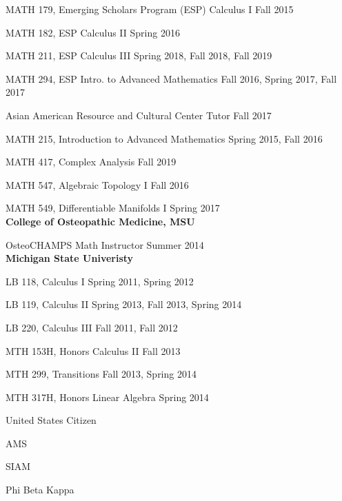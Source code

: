 \begin{singlespace}
MATH 179, Emerging Scholars Program (ESP) Calculus I \hfill Fall 2015 

MATH 182, ESP Calculus II \hfill Spring 2016 

MATH 211, ESP Calculus III \hfill Spring 2018, Fall 2018, Fall 2019

MATH 294, ESP Intro. to Advanced Mathematics \hfill Fall 2016, Spring 2017, Fall 2017\\


Asian American Resource and Cultural Center Tutor \hfill Fall 2017\\


MATH 215, Introduction to Advanced Mathematics \hfill Spring 2015, Fall 2016

MATH 417, Complex Analysis \hfill Fall 2019

MATH 547, Algebraic Topology I \hfill Fall 2016

MATH 549, Differentiable Manifolds I \hfill Spring 2017\\

{\bf College of Osteopathic Medicine, MSU}

OsteoCHAMPS Math Instructor \hfill Summer 2014\\


{\bf Michigan State Univeristy}\\

LB 118, Calculus I \hfill Spring 2011, Spring 2012 

LB 119, Calculus II \hfill Spring 2013, Fall 2013, Spring 2014

LB 220, Calculus III \hfill Fall 2011, Fall 2012

MTH 153H, Honors Calculus II \hfill Fall 2013 

MTH 299, Transitions \hfill Fall 2013, Spring 2014

MTH 317H, Honors Linear Algebra \hfill Spring 2014 \\


\vspace{5pt}
\hspace{-12pt}{\color{sectiontitles}{\large Affiliations}}
\vspace{10pt}

United States Citizen

AMS

SIAM

Phi Beta Kappa

\end{singlespace}
